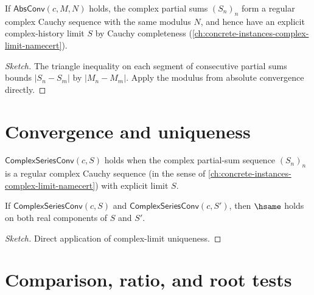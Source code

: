 \begin{lemma}
\label{lem:abs-conv-implies-conv}
If \(\mathsf{AbsConv}(c, M, N)\) holds, the complex partial sums \((S_n)_n\) form a regular complex Cauchy sequence with the same modulus \(N\), and hence have an explicit complex-history limit \(S\) by Cauchy completeness (\autoref{ch:concrete-instances-complex-limit-namecert}).
\end{lemma}
\begin{proof}[Sketch]
The triangle inequality on each segment of consecutive partial sums bounds \(|S_n - S_m|\) by \(|M_n - M_m|\). Apply the modulus from absolute convergence directly.
\end{proof}

\section{Convergence and uniqueness}

\begin{definition}
\label{def:complex-series-conv}
\(\mathsf{ComplexSeriesConv}(c, S)\) holds when the complex partial-sum sequence \((S_n)_n\) is a regular complex Cauchy sequence (in the sense of \autoref{ch:concrete-instances-complex-limit-namecert}) with explicit limit \(S\).
\end{definition}

\begin{theorem}
\label{thm:complex-series-sum-unique}
If \(\mathsf{ComplexSeriesConv}(c, S)\) and \(\mathsf{ComplexSeriesConv}(c, S')\), then \(\hsame\) holds on both real components of \(S\) and \(S'\).
\end{theorem}
\begin{proof}[Sketch]
Direct application of complex-limit uniqueness.
\end{proof}

\section{Comparison, ratio, and root tests}

